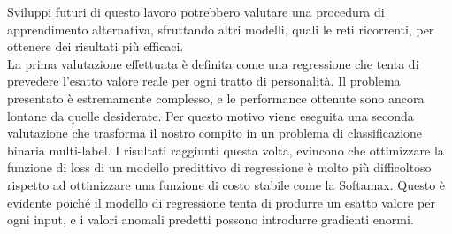 Sviluppi futuri di questo lavoro potrebbero valutare una procedura di apprendimento alternativa, sfruttando altri modelli, quali le reti ricorrenti,  per ottenere dei risultati più efficaci.\\


La prima valutazione effettuata è definita come una regressione che tenta di prevedere l'esatto valore reale per ogni tratto di personalità.
Il problema presentato è estremamente complesso, e le performance ottenute sono ancora lontane da quelle desiderate.
Per questo motivo viene eseguita una seconda valutazione che trasforma il nostro compito in un problema di classificazione binaria multi-label.
I risultati raggiunti questa volta, evincono che ottimizzare la funzione di loss di un modello predittivo di regressione è molto più difficoltoso rispetto ad ottimizzare una funzione di costo stabile come la Softamax.
Questo è evidente poiché il modello di regressione tenta di produrre un esatto valore per ogni input, e i valori anomali predetti possono introdurre gradienti enormi.

 




